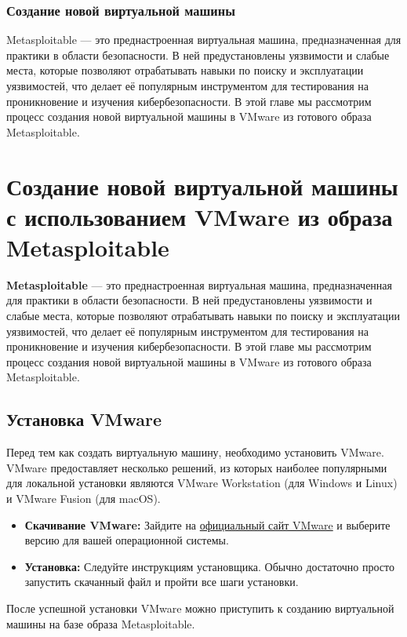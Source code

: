 \subsubsection{Создание новой виртуальной машины}
Metasploitable — это преднастроенная виртуальная машина, предназначенная для практики в области безопасности.
В ней предустановлены уязвимости и слабые места, которые позволяют отрабатывать навыки по поиску и эксплуатации
уязвимостей, что делает её популярным инструментом для тестирования на проникновение и изучения кибербезопасности.
В этой главе мы рассмотрим процесс создания новой виртуальной машины в VMware из готового образа Metasploitable.

\section{Создание новой виртуальной машины с использованием VMware из образа Metasploitable}

\textbf{Metasploitable} --- это преднастроенная виртуальная машина, предназначенная для практики в области безопасности. В ней предустановлены уязвимости и слабые места, которые позволяют отрабатывать навыки по поиску и эксплуатации уязвимостей, что делает её популярным инструментом для тестирования на проникновение и изучения кибербезопасности. В этой главе мы рассмотрим процесс создания новой виртуальной машины в VMware из готового образа Metasploitable.

\subsection{Установка VMware}

Перед тем как создать виртуальную машину, необходимо установить VMware. VMware предоставляет несколько решений, из которых наиболее популярными для локальной установки являются VMware Workstation (для Windows и Linux) и VMware Fusion (для macOS).

\begin{itemize}
	\item \textbf{Скачивание VMware:} Зайдите на \href{https://www.vmware.com/}{официальный сайт VMware} и выберите версию для вашей операционной системы.
	\item \textbf{Установка:} Следуйте инструкциям установщика. Обычно достаточно просто запустить скачанный файл и пройти все шаги установки.
\end{itemize}

После успешной установки VMware можно приступить к созданию виртуальной машины на базе образа Metasploitable.

